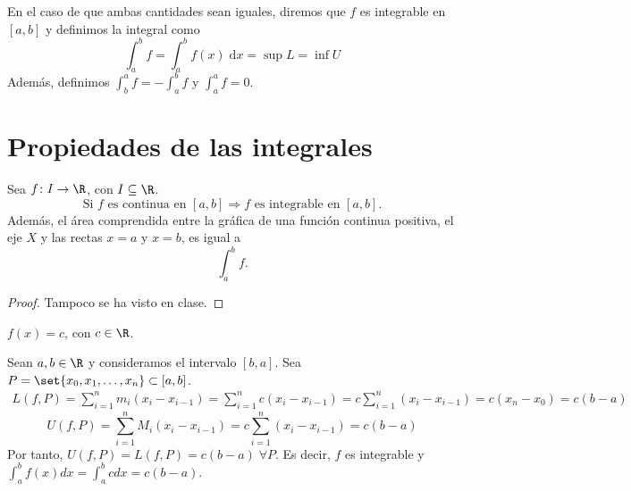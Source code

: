 En el caso de que ambas cantidades sean iguales, diremos que \(f \) es integrable en \([a,b ]\) y definimos la integral como
\[
	\int^{b}_{a} f = \int^{b}_{a} f(x) \; \mathrm{d} x = \sup L = \inf U
\]
Además, definimos \(\int^{a}_b f = - \int^{b}_{a} f \) y \(\int^{a}_{a} f =0 \).

\vspace{1.5cm}
\section{Propiedades de las integrales}
\begin{theorem}
	Sea \(f\colon I \to \R\), con \(I \subseteq \R\). 
	\[
		\text{Si } f \text{ es continua en } [a,b] \Rightarrow f \text{ es integrable en } [a,b].     
	\]
	Además, el área comprendida entre la gráfica de una función continua positiva, el eje \(X \) y las rectas \(x = a \) y \(x = b\), es igual a 
	\[
		\int^{b}_{a} f. 
	\]
\end{theorem}
\begin{proof}
	Tampoco se ha visto en clase. 
\end{proof}
\begin{example}
	\(f(x) = c \), con \(c \in \R\).
	
	Sean \(a,b \in \R \) y consideramos el intervalo \([b,a ]\). Sea \(P = \set{x_0, x_1, \ldots, x_n } \subset [a,b]\).
	\begin{multline*}
		L (f, P) = \sum_{i=1}^{n } m_i (x_i - x_{i-1}) = \sum_{i=1}^{n } c(x_i - x_{i-1}) = c \sum_{i=1}^{n } (x_i - x_{i-1}) = c (x_n - x_0) = c (b-a)
	\end{multline*}
	\[
		U(f, P) = \sum_{i=1}^{n } M_i (x_i - x_{i-1}) = c \sum_{i=1}^{n } (x_i - x_{i-1}) = c(b-a)
	\]
	Por tanto, \(U(f,P) = L(f,P) = c(b-a ) \; \forall P\). Es decir, \(f \) es integrable y \(\int^{b}_{a} f(x)dx = \int^{b}_a c dx  = c(b-a) \).
	\begin{figure}[H]
		\centering
	\end{figure}
\end{example}
